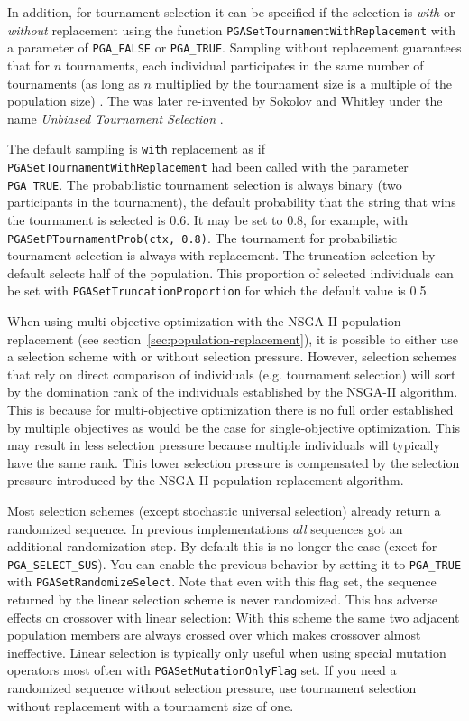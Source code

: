 \documentclass{report}
\begin{document}
In addition, for tournament selection it can be
specified if the selection is \textit{with} or \textit{without}
replacement using the function \verb+PGASetTournamentWithReplacement+ with
a parameter of \verb+PGA_FALSE+ or \verb+PGA_TRUE+. Sampling without
replacement guarantees that for $n$ tournaments, each individual
participates in the same number of tournaments (as long as $n$
multiplied by the tournament size is a multiple of the population size)
\cite{GKD89}. The was later re-invented by Sokolov and Whitley under
the name \textit{Unbiased Tournament Selection} \cite{SW05}.

The default sampling is
\texttt{with} replacement as if \verb+PGASetTournamentWithReplacement+
had been called with the parameter \verb+PGA_TRUE+.  The probabilistic
tournament selection is always binary (two participants in the
tournament), the default probability that the string that wins the
tournament is selected is 0.6.  It may be set to 0.8, for example, with {\tt
PGASetPTournamentProb(ctx, 0.8)}. The tournament for probabilistic
tournament selection is always with replacement. The truncation selection
by default selects half of the population. This proportion of selected
individuals can be set with \verb+PGASetTruncationProportion+ for which
the default value is 0.5.

When using multi-objective optimization with the NSGA-II \cite{DPAM02}
population replacement (see section~\ref{sec:population-replacement}),
it is possible to either use a selection scheme with or without
selection pressure. However, selection schemes that rely on direct
comparison of individuals (e.g. tournament selection) will sort by the
domination rank of the individuals established by the NSGA-II algorithm.
This is because for multi-objective optimization there is no full order
established by multiple objectives as would be the case for
single-objective optimization. This may result in less selection
pressure because multiple individuals will typically have the same rank.
This lower selection pressure is compensated by the selection pressure
introduced by the NSGA-II population replacement algorithm.

Most selection schemes (except stochastic universal selection) already
return a randomized sequence. In previous implementations \textit{all}
sequences got an additional randomization step. By default this is no
longer the case (exect for \verb+PGA_SELECT_SUS+). You can enable the
previous behavior by setting it to \verb+PGA_TRUE+ with
\verb+PGASetRandomizeSelect+. Note that even with this flag set, the
sequence returned by the linear selection scheme is never randomized.
This has adverse effects on crossover with linear selection:
With this scheme the same two adjacent population members are always
crossed over which makes crossover almost ineffective.
Linear selection is typically only useful when using special
mutation operators most often with \verb+PGASetMutationOnlyFlag+ set.
If you need a randomized sequence without selection pressure, use
tournament selection without replacement with a tournament size of one.
\end{document}
